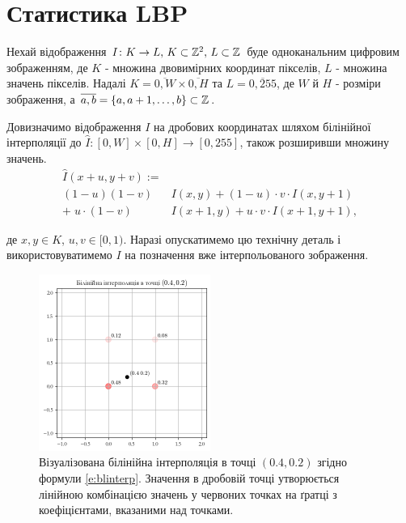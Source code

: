 \section{Статистика LBP}\label{section1.lbp}

Нехай відображення \(I \colon K \to L$, $K \subset \Z^2$, $L \subset \Z\) 
буде одноканальним цифровим зображенням, 
де $K$ - множина двовимірних координат пікселів, $L$ - множина значень пікселів.
Надалі $K = \overline{0,W} \times \overline{0,H}$ та $L = \overline{0,255}$, 
де $W$ й $H$ - розміри зображення, а $\overline{a,b} = \{a, a+1, \dots , b\} \subset \mathbb Z$.

Довизначимо відображення $I$ на дробових координатах шляхом білінійної інтерполяції до $\hat I \colon [0,W] \times [0,H] \to [0,255]$, також розширивши множину значень.
\begin{equation}
\begin{split}\label{e:blinterp}
    \hat I(x+u,y+v) := \\
    (1 - u)(1 - v) & I(x,y) + (1-u) \cdot v \cdot I(x,y+1)\\ 
    + \; u \cdot (1-v) & I(x+1,y) + u \cdot v \cdot  I(x+1,y+1),
\end{split}
\end{equation}

де $x,y \in K$, $u,v \in [0,1)$. 
Наразі опускатимемо цю технічну деталь і використовуватимемо $I$ на позначення вже інтерпольованого зображення.

\begin{figure}[h]
    \centering
    \includegraphics[width=0.5\textwidth]{img/bilinear-interpolation-1.png}
    \caption{
        Візуалізована білінійна інтерполяція в точці $(0.4,0.2)$ згідно формули \ref{e:blinterp}. 
        Значення в дробовій точці утворюється лінійною комбінацією значень у червоних точках на ґратці
        з коефіцієнтами, вказаними над точками.
    }
    \label{fig:bilinear-interp}
\end{figure}


